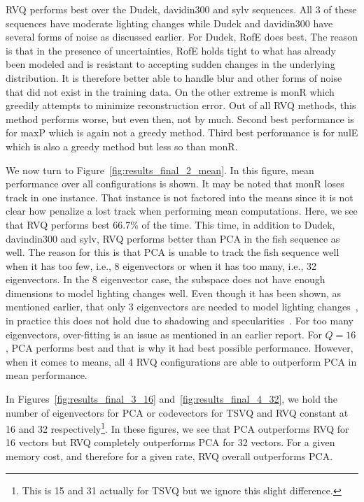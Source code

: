 RVQ performs best over the Dudek, davidin300 and sylv sequences.  All 3 of these sequences have moderate lighting changes while Dudek and davidin300 have several forms of noise as discussed earlier.  For Dudek, RofE does best.  The reason is that in the presence of uncertainties, RofE holds tight to what has already been modeled and is resistant to accepting sudden changes in the underlying distribution.  It is therefore better able to handle blur and other forms of noise that did not exist in the training data.  On the other extreme is monR which greedily attempts to minimize reconstruction error.  Out of all RVQ methods, this method performs worse, but even then, not by much.  Second best performance is for maxP which is again not a greedy method.  Third best performance is for nulE which is also a greedy method but less so than monR.

We now turn to Figure~\ref{fig:results_final_2_mean}.  In this figure, mean performance over all configurations is shown.  It may be noted that monR loses track in one instance.  That instance is not factored into the means since it is not clear how penalize a lost track when performing mean computations.  Here, we see that RVQ performs best 66.7\% of the time.  This time, in addition to Dudek, davindin300 and sylv, RVQ performs better than PCA in the fish sequence as well.  The reason for this is that PCA is unable to track the fish sequence well when it has too few, i.e., 8 eigenvectors or when it has too many, i.e., 32 eigenvectors.  In the 8 eigenvector case, the subspace does not have enough dimensions to model lighting changes well.  Even though it has been shown, as mentioned earlier, that only 3 eigenvectors are needed to model lighting changes~\cite{1987_JNL_Faces_Sirovich}, in practice this does not hold due to shadowing and specularities~\cite{1997_JNL_EigenVsFisherFaces_Bel}.  For too many eigenvectors, over-fitting is an issue as mentioned in an earlier report.  For $Q=16$, PCA performs best and that is why it had best possible performance.  However, when it comes to means, all 4 RVQ configurations are able to outperform PCA in mean performance.

In Figures~\ref{fig:results_final_3_16} and~\ref{fig:results_final_4_32}, we hold the number of eigenvectors for PCA or codevectors for TSVQ and RVQ constant at 16 and 32 respectively\footnote{This is 15 and 31 actually for TSVQ but we ignore this slight difference.}.  In these figures, we see that PCA outperforms RVQ for 16 vectors but RVQ completely outperforms PCA for 32 vectors.  For a given memory cost, and therefore for a given rate, RVQ overall outperforms PCA.  

